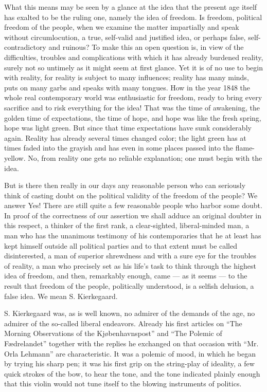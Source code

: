 \documentclass[12pt,a4paper,openany]{book}
\newcommand{\opage}[1]{\marginnote{\footnotesize\textit{[#1]}}}
\begin{document}
What this means may be seen by a glance at the
idea that the present age itself has exalted to be the
ruling one, namely the idea of freedom. Is freedom,
political freedom of the people, when we examine the matter impartially
and speak without circumlocution, a true, self-valid and justified
idea, or perhaps false, self-contradictory and ruinous?
To make this an open question is, in view
of the difficulties, troubles and complications
with which it has already burdened reality, surely not
so untimely as it might seem at first glance.
Yet it is of no use to begin with reality,
for reality is subject to many influences;
reality has many minds, puts on many
garbs and speaks with many tongues. How in the year
1848 the whole real contemporary world was enthusiastic for freedom,
ready to bring every sacrifice and to risk everything
for the idea! That was the time of awakening, the golden time of
\setcounter{footnote}{0}%
\opage{4}expectations, the time of hope, and hope was like the
fresh spring, hope was light green. But since that time expectations
have sunk considerably again.
Reality has already several times changed
color; the light green has at times faded into
the grayish and has even in some places passed into
the flame-yellow. No, from reality one gets no
reliable explanation; one must begin with the idea.

But is there then really in our days any reasonable
person who can seriously think of casting
doubt on the political validity of the freedom of the people? We answer
Yes! There are still quite a few reasonable people
who harbor some doubt. In proof of the correctness
of our assertion we shall adduce an original
doubter in this respect, a thinker of the first rank, a clear-sighted, liberal-minded
man, a man who has the unanimous testimony
of his contemporaries that he at least has kept himself outside
all political parties and to that extent must be called disinterested,
a man of superior shrewdness and with a sure eye for
the troubles of reality, a man who precisely set
as his life's task to think through the highest idea of freedom,
and then, remarkably enough, came --- as it seems
--- to the result that freedom of the people, politically understood,
is a selfish delusion, a false idea. We mean S.
Kierkegaard.

S. Kierkegaard was, as is well known, no admirer
of the demands of the age, no admirer of the so-called liberal
endeavors. Already his first articles on ``The Morning Observations
of the Kjøbenhavnspost'' and ``The Polemic
of Fædrelandet'' together with the replies he exchanged on that occasion %
with ``Mr. Orla Lehmann'' are characteristic. It was a
\setcounter{footnote}{0}%
\opage{5}polemic of mood, in which he began by trying
his sharp pen; it was his first grip on the string-play
of ideality, a few quick strokes of the bow, to hear the tone,
and the tone indicated plainly enough that this violin would not
tune itself to the blowing instruments of politics.
\end{document}
